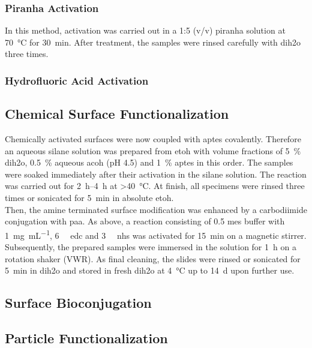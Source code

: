 \subsubsection{Piranha Activation}
In this method, activation was carried out in a 1:5 (v/v) piranha solution at \SI{70}{\degreeCelsius} for \SI{30}{\minute}. After treatment, the samples were rinsed carefully with \gls{dih2o} three times.
\subsubsection{Hydrofluoric Acid Activation}

\subsection{Chemical Surface Functionalization}
Chemically activated surfaces were now coupled with \gls{aptes} covalently. Therefore an aqueous silane solution was prepared from \gls{etoh} with volume fractions of \SI{5}{\percent} \gls{dih2o}, \SI{0.5}{\percent} aqueous \gls{acoh} (pH 4.5) and \SI{1}{\percent} \gls{aptes} in this order. The samples were soaked immediately after their activation in the silane solution. The reaction was carried out for \SIrange{2}{4}{\hour} at \SI{>40}{\degreeCelsius}. At finish, all specimens were rinsed three times or sonicated for \SI{5}{\minute} in absolute \gls{etoh}.\\
Then, the amine terminated surface modification was enhanced by a carbodiimide conjugation with \gls{paa}. As above, a reaction consisting of \SI{0.5}{\molar} \gls{mes} buffer with \SI{1}{\milli\gram\per\milli\liter}, \SI{6}{\milli\molar} \gls{edc} and  \SI{3}{\milli\molar} \gls{nhs} was activated for \SI{15}{\minute} on a magnetic stirrer. Subsequently, the prepared samples were immersed in the solution for \SI{1}{\hour} on a rotation shaker (VWR). As final cleaning, the slides were rinsed or sonicated for \SI{5}{\minute} in \gls{dih2o} and stored in fresh \gls{dih2o} at \SI{4}{\degreeCelsius} up to \SI{14}{\day} upon further use.\cite{lib:chem:Anti-EpCAM-PAA}
\subsection{Surface Bioconjugation}

\subsection{Particle Functionalization}





